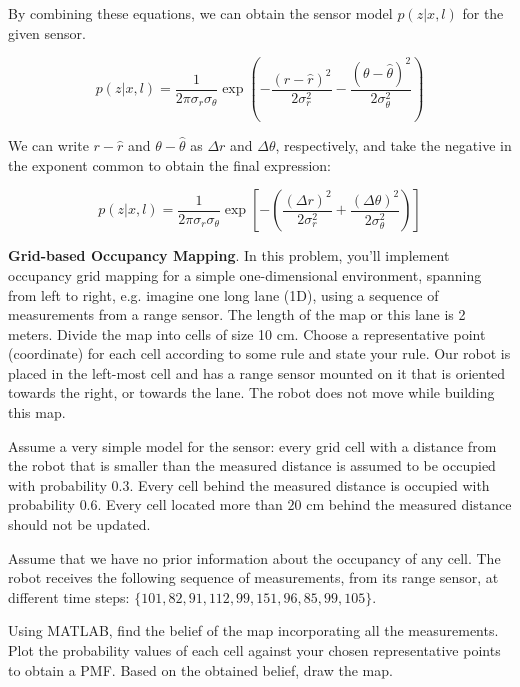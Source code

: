\documentclass[answers]{exam}
\begin{document}
\begin{questions}
\begin{solution}
        By combining these equations, we can obtain the sensor model $p(z|x, l)$ for
        the given sensor.

        \[
            p(z | x, l) = \frac{1}{2\pi\sigma_r\sigma_\theta} \exp\left(-\frac{(r - \hat{r})^2}{2\sigma_r^2} - \frac{(\theta - \hat{\theta})^2}{2\sigma_\theta^2}\right)
        \]

        We can write $r - \hat{r}$ and $\theta - \hat{\theta}$ as $\Delta r$ and
        $\Delta \theta$, respectively, and take the negative in the exponent common to
        obtain the final expression:

        \[
            p(z | x, l) = \frac{1}{2\pi\sigma_r\sigma_\theta} \exp\left[- \left(\frac{(\Delta r)^2}{2\sigma_r^2} + \frac{(\Delta \theta)^2}{2\sigma_\theta^2}\right)\right]
        \]
    \end{solution}

    \question[25]
    \textbf{Grid-based Occupancy Mapping}. In this problem, you'll implement occupancy grid mapping
    for a simple one-dimensional environment, spanning from left to right, e.g. imagine one long
    lane (1D), using a sequence of measurements from a range sensor. The length of the map or
    this lane is 2 meters. Divide the map into cells of size 10 cm. Choose a representative point
    (coordinate) for each cell according to some rule and state your rule. Our robot is placed in
    the left-most cell and has a range sensor mounted on it that is oriented towards the right, or
    towards the lane. The robot does not move while building this map.

    Assume a very simple model for the sensor: every grid cell with a distance from
    the robot that is smaller than the measured distance is assumed to be occupied
    with probability $0.3$. Every cell behind the measured distance is occupied
    with probability $0.6$. Every cell located more than $20$ cm behind the
    measured distance should not be updated.

    Assume that we have no prior information about the occupancy of any cell. The
    robot receives the following sequence of measurements, from its range sensor,
    at different time steps: $\{101, 82, 91, 112, 99, 151, 96, 85, 99, 105\}$.

    Using MATLAB, find the belief of the map incorporating all the measurements.
    Plot the probability values of each cell against your chosen representative
    points to obtain a PMF. Based on the obtained belief, draw the map.


\end{questions}
\end{document}
